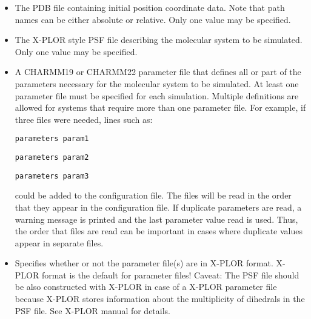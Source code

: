 \begin{itemize}
\item
{}
{\label{param:coordinates}
The PDB file containing initial position coordinate data.  
Note that path names can be either absolute or relative.  
Only one value may be specified.}

\item
{}
{\label{param:structure}
The X-PLOR style PSF file describing the molecular 
system to be simulated.  
Only one value may be specified.}

\item
{}
{\label{param:parameters}
A CHARMM19 or CHARMM22 parameter file that defines all or part 
of the parameters necessary for the molecular system to be simulated.  
At least one parameter file must be specified for each simulation.  
Multiple definitions are allowed for systems that require more 
than one parameter file.  For example, if three files were needed, 
lines such as:

\bigskip

\verb!parameters param1!

\verb!parameters param2!

\verb!parameters param3!

\bigskip

\noindent could be added to the configuration file.  
The files will be read 
in the order that they appear in the configuration file.  If duplicate
parameters are read, a warning message is printed and the last
parameter value read is used.  Thus, the order that files are read 
can be important in cases where duplicate values appear in 
separate files.}

\item
{}
{Specifies whether or not the parameter file(s) are in X-PLOR format.
 X-PLOR format is the default for parameter files!
 Caveat: The PSF file should be also constructed with X-PLOR in
 case of a X-PLOR parameter file because X-PLOR stores information
 about the multiplicity of dihedrals in the PSF file. See X-PLOR
 manual for details.}


\end{itemize}
